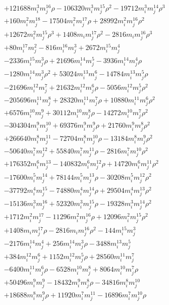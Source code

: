 {\begin{align*}
&+121688m_i^{3}m_j^{16}\rho-106320m_i^{3}m_j^{15}\rho^{2}-19712m_i^{3}m_j^{14}\rho^{3}\\
&+160m_i^{2}m_j^{18}-17504m_i^{2}m_j^{17}\rho+28992m_i^{2}m_j^{16}\rho^{2}\\
&+12672m_i^{2}m_j^{15}\rho^{3}+1408m_im_j^{17}\rho^{2}-2816m_im_j^{16}\rho^{3}\\
&+80m_i^{17}m_j^{2}-816m_i^{16}m_j^{3}+2672m_i^{15}m_j^{4}\\
&-2336m_i^{15}m_j^{3}\rho+21696m_i^{14}m_j^{5}-3936m_i^{14}m_j^{4}\rho\\
&-1280m_i^{14}m_j^{3}\rho^{2}+53024m_i^{13}m_j^{6}-14784m_i^{13}m_j^{5}\rho\\
&-21696m_i^{12}m_j^{7}+21632m_i^{12}m_j^{6}\rho-5056m_i^{12}m_j^{5}\rho^{2}\\
&-205696m_i^{11}m_j^{8}+28320m_i^{11}m_j^{7}\rho+10880m_i^{11}m_j^{6}\rho^{2}\\
&+6576m_i^{10}m_j^{9}+30112m_i^{10}m_j^{8}\rho-14272m_i^{10}m_j^{7}\rho^{2}\\
&-304304m_i^{9}m_j^{10}+69376m_i^{9}m_j^{9}\rho+21760m_i^{9}m_j^{8}\rho^{2}\\
&+266640m_i^{8}m_j^{11}-72704m_i^{8}m_j^{10}\rho-13184m_i^{8}m_j^{9}\rho^{2}\\
&-50640m_i^{7}m_j^{12}+55840m_i^{7}m_j^{11}\rho-2816m_i^{7}m_j^{10}\rho^{2}\\
&+176352m_i^{6}m_j^{13}-140832m_i^{6}m_j^{12}\rho+14720m_i^{6}m_j^{11}\rho^{2}\\
&-17600m_i^{5}m_j^{14}+78144m_i^{5}m_j^{13}\rho-30208m_i^{5}m_j^{12}\rho^{2}\\
&-37792m_i^{4}m_j^{15}-74880m_i^{4}m_j^{14}\rho+29504m_i^{4}m_j^{13}\rho^{2}\\
&-15136m_i^{3}m_j^{16}+52320m_i^{3}m_j^{15}\rho-19328m_i^{3}m_j^{14}\rho^{2}\\
&+1712m_i^{2}m_j^{17}-11296m_i^{2}m_j^{16}\rho+12096m_i^{2}m_j^{15}\rho^{2}\\
&+1408m_im_j^{17}\rho-2816m_im_j^{16}\rho^{2}-144m_i^{15}m_j^{3}\\
&-2176m_i^{14}m_j^{4}+256m_i^{14}m_j^{3}\rho-3488m_i^{13}m_j^{5}\\
&+384m_i^{12}m_j^{6}+1152m_i^{12}m_j^{5}\rho+28560m_i^{11}m_j^{7}\\
&-6400m_i^{11}m_j^{6}\rho-6528m_i^{10}m_j^{8}+8064m_i^{10}m_j^{7}\rho\\
&+50496m_i^{9}m_j^{9}-18432m_i^{9}m_j^{8}\rho-34816m_i^{8}m_j^{10}\\
&+18688m_i^{8}m_j^{9}\rho+11920m_i^{7}m_j^{11}-16896m_i^{7}m_j^{10}\rho\\

\end{align*}}
